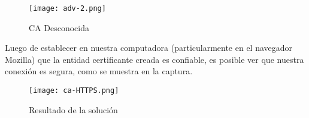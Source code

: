 \begin{center}
    \begin{figure}   
       \begin{center}
          \texttt{[image: adv-2.png]}
       \end{center}
       \caption{CA Desconocida}
       \label{figCAdesc}
    \end{figure}
 \end{center}

Luego de establecer en nuestra computadora (particularmente en el navegador Mozilla) que la 
entidad certificante creada es confiable, es posible ver que nuestra conexión es segura, como 
se muestra en la captura.

\begin{center}
    \begin{figure}   
       \begin{center}
          \texttt{[image: ca-HTTPS.png]}
       \end{center}
       \caption{Resultado de la solución}
    \end{figure}
 \end{center}





